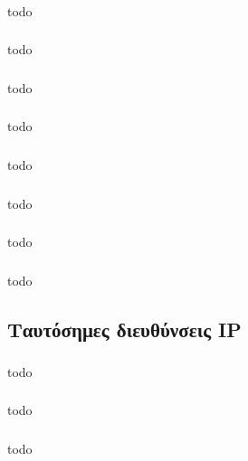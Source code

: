 \documentclass[a4paper, 12pt]{article}
\begin{document}
		\subsubsection{}
			todo

		\subsubsection{}
			todo

		\subsubsection{}
			todo

		\subsubsection{}
			todo

		\subsubsection{}
			todo

		\subsubsection{}
			todo

		\subsubsection{}
			todo

		\subsubsection{}
			todo

	\subsection{Ταυτόσημες διευθύνσεις IP}

		\subsubsection{}
			todo

		\subsubsection{}
			todo

		\subsubsection{}
			todo
\end{document}
